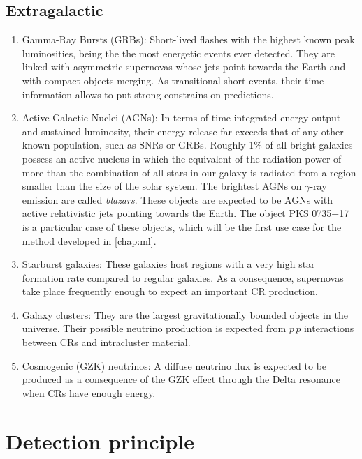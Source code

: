 \subsection{Extragalactic}

\begin{enumerate}[label=\textbullet]

	\item Gamma-Ray Bursts (GRBs): Short-lived flashes with the highest known peak luminosities, being the the most energetic events ever detected. They are linked with asymmetric supernovas whose jets point towards the Earth and with compact objects merging. As transitional short events, their time information allows to put strong constrains on predictions.
    
	\item Active Galactic Nuclei (AGNs): In terms of time-integrated energy output and sustained luminosity, their energy release far exceeds that of any other known population, such as SNRs or GRBs. Roughly 1\% of all bright galaxies possess an active nucleus in which the equivalent of the radiation power of more than the combination of all stars in our galaxy is radiated from a region smaller than the size of the solar system. The brightest AGNs on $\gamma$-ray emission are called \textit{blazars}. These objects are expected to be AGNs with active relativistic jets pointing towards the Earth. The object PKS 0735+17 is a particular case of these objects, which will be the first use case for the method developed in \autoref{chap:ml}. 
	
	\item Starburst galaxies: These galaxies host regions with a very high star formation rate compared to regular galaxies. As a consequence, supernovas take place frequently enough to expect an important CR production.
	
	\item Galaxy clusters: They are the largest gravitationally bounded objects in the universe. Their possible neutrino production is expected from $p\,p$ interactions between CRs and intracluster material.
	
	\item Cosmogenic (GZK) neutrinos: A diffuse neutrino flux is expected to be produced as a consequence of the GZK effect through the Delta resonance when CRs have enough energy.
\end{enumerate}

\section{Detection principle}

